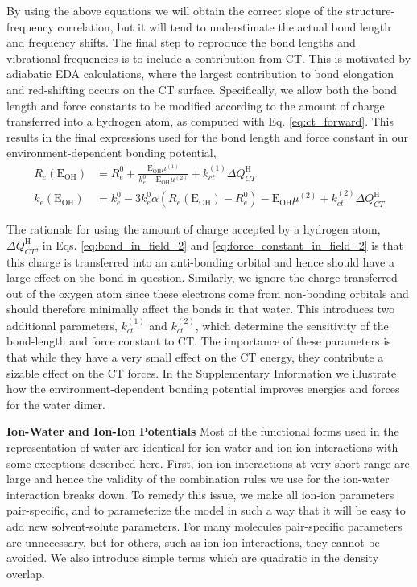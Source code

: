 \documentclass[journal=jctcce,manuscript=article]{achemso}
\begin{document}
By using the above equations we will obtain the correct slope of the structure-frequency correlation, but it will tend to understimate the actual bond length and frequency shifts. The final step to reproduce the bond lengths and vibrational frequencies is to include a contribution from CT. This is motivated by adiabatic EDA calculations, where the largest contribution to bond elongation and red-shifting occurs on the CT surface.\cite{mao2017energy} Specifically, we allow both the bond length and force constants to be modified according to the amount of charge transferred into a hydrogen atom, as computed with Eq. \ref{eq:ct_forward}. This results in the final expressions used for the bond length and force constant in our environment-dependent bonding potential,
\begin{align}
  \label{eq:bond_in_field_2}
  R_e(\mathrm{E_{OH}})&=R_e^0+ \frac{\mathrm{E_{OH}}\mu^{(1)}}{k_e^0-\mathrm{E_{OH}}\mu^{(2)}} + k_{ct}^{(1)}\Delta Q_{CT}^{\mathrm{H}} \\
  \label{eq:force_constant_in_field_2}
  k_e(\mathrm{E_{OH}})&=k_e^0-3k_e^0\alpha\left(R_e(\mathrm{E_{OH}})-R_e^0\right)-\mathrm{E_{OH}}\mu^{(2)}+k_{ct}^{(2)}\Delta Q_{CT}^{\mathrm{H}}
\end{align}

The rationale for using the amount of charge accepted by a hydrogen atom, $\Delta Q_{CT}^{\mathrm{H}}$, in Eqs. \ref{eq:bond_in_field_2} and \ref{eq:force_constant_in_field_2} is that this charge is transferred into an anti-bonding orbital and hence should have a large effect on the  bond in question. Similarly, we ignore the charge transferred out of the oxygen atom since these electrons come from non-bonding orbitals and should therefore minimally affect the  bonds in that water. This introduces two additional parameters, $k_{ct}^{(1)}$ and $k_{ct}^{(2)}$, which determine the sensitivity of the bond-length and force constant to CT. The importance of these parameters is that while they have a very small effect on the CT energy, they contribute a sizable effect on the CT forces. In the Supplementary Information we illustrate how the environment-dependent bonding potential improves energies and forces for the water dimer. 


\textbf{Ion-Water and Ion-Ion Potentials}
Most of the functional forms used in the representation of water are identical for ion-water and ion-ion interactions with some exceptions described here. First, ion-ion interactions at very short-range are large and hence the validity of the combination rules we use for the ion-water interaction breaks down. To remedy this issue, we make all ion-ion parameters pair-specific, and to parameterize the model in such a way that it will be easy to add new solvent-solute parameters. For many molecules pair-specific parameters are unnecessary, but for others, such as ion-ion interactions, they cannot be avoided. We also introduce simple terms which are quadratic in the density overlap.
\end{document}

